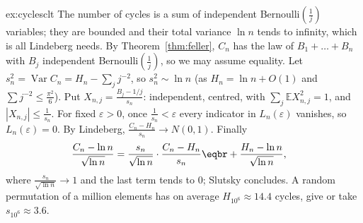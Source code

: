 \begin{solution}{ex:cyclesclt}
\idea The number of cycles is a sum of independent Bernoulli$(\frac1j)$ variables; they are bounded and their total
variance $\ln n$ tends to infinity, which is all Lindeberg needs.
\writeup By Theorem~\ref{thm:feller}, $C_n$ has the law of $B_1+\dots+B_n$ with $B_j$ independent Bernoulli$(\frac1j)$, so we may assume equality. Let
$s_n^2=\operatorname{Var}C_n=H_n-\sum_jj^{-2}$, so $s_n^2\sim\ln n$ (as $H_n=\ln n+O(1)$ and $\sum j^{-2}\le\frac{\pi^2}6$). Put $X_{n,j}=\frac{B_j-1/j}{s_n}$: independent, centred, with
$\sum_j\mathbb E X_{n,j}^2=1$, and $|X_{n,j}|\le\frac1{s_n}$. For fixed $\varepsilon>0$, once $\frac1{s_n}<\varepsilon$ every indicator in $L_n(\varepsilon)$ vanishes, so $L_n(\varepsilon)=0$. By Lindeberg,
$\frac{C_n-H_n}{s_n}\to N(0,1)$. Finally
\[
\begin{aligned}\frac{C_n-\ln n}{\sqrt{\ln n}}&=\frac{s_n}{\sqrt{\ln n}}\cdot\frac{C_n-H_n}{s_n}\eqbr+\frac{H_n-\ln n}{\sqrt{\ln n}},\end{aligned}
\]
where $\frac{s_n}{\sqrt{\ln n}}\to1$ and the last term tends to $0$; Slutsky concludes. A random permutation of a million elements has on average
$H_{10^6}\approx14.4$ cycles, give or take $s_{10^6}\approx3.6$.
\end{solution}


